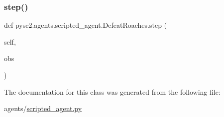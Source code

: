 \subsubsection{\texorpdfstring{step()}{step()}}
{\footnotesize\ttfamily def pysc2.\+agents.\+scripted\+\_\+agent.\+Defeat\+Roaches.\+step (\begin{DoxyParamCaption}\item[{}]{self,  }\item[{}]{obs }\end{DoxyParamCaption})}



The documentation for this class was generated from the following file\+:\begin{DoxyCompactItemize}
\item 
agents/\mbox{\hyperlink{scripted__agent_8py}{scripted\+\_\+agent.\+py}}\end{DoxyCompactItemize}
